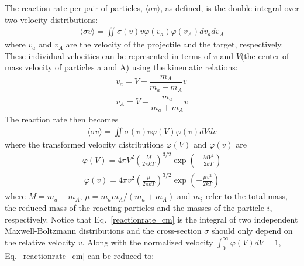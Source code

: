 The reaction rate per pair of particles, $\langle \sigma v \rangle$, as defined, is the double integral over two velocity distributions:
\begin{equation}
    \label{reactionrate1}
    \begin{aligned}
         \langle \sigma v \rangle=\iint \sigma(v)v\varphi(v_a)\varphi(v_A)dv_adv_A
    \end{aligned}
\end{equation}
where $v_a$ and $v_A$ are the velocity of the projectile and the target, respectively. These individual velocities can be represented in terms of $v$ and $V$(the center of mass velocity of particles a and A) using the kinematic relations:
\begin{equation}
    \label{kinematics}
    \begin{aligned}
        v_a = V + \dfrac{m_A}{m_a + m_A}  v  \\
        v_A = V - \dfrac{m_a}{m_a + m_A}  v
    \end{aligned}
\end{equation}
The reaction rate then becomes
\begin{equation}
    \label{reactionrate_cm}
    \begin{aligned}
        \langle \sigma v \rangle=\iint \sigma(v)v\varphi(V)\varphi(v)dVdv
    \end{aligned}
\end{equation}
where the transformed velocity distributions $\varphi(V)$ and $\varphi(v)$ are
\begin{equation}
    \label{V}
    \begin{aligned}
        \varphi(V)=4\pi V^2 (\frac{M}{2\pi kT})^{3/2} \exp(-\frac{MV^2}{2kT})
    \end{aligned}
\end{equation}
\begin{equation}
    \label{v}
    \begin{aligned}
        \varphi(v)=4\pi v^2 (\frac{\mu}{2\pi kT})^{3/2} \exp(-\frac{\mu v^2}{2kT})
    \end{aligned}
\end{equation}
where $M=m_a+m_A$, $\mu=m_a m_A/(m_a + m_A)$ and $m_i$  refer to the total mass, the reduced mass of the reacting particles and the masses of the particle $i$, respectively. Notice that Eq.~\ref{reactionrate_cm} is the integral of two independent Maxwell-Boltzmann distributions and the cross-section $\sigma$ should only depend on the relative velocity $v$. Along with the normalized velocity $\int_{0}^{\infty} \varphi(V)dV=1$, Eq.~\ref{reactionrate_cm} can be reduced to:
